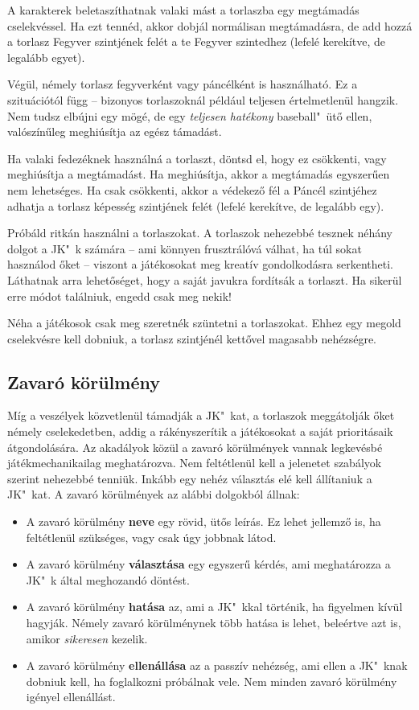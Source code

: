 A karakterek beletaszíthatnak valaki mást a torlaszba egy megtámadás cselekvéssel. Ha ezt tennéd, akkor dobjál normálisan megtámadásra, de add hozzá a torlasz Fegyver szintjének felét a te Fegyver szintedhez (lefelé kerekítve, de legalább egyet).

Végül, némely torlasz fegyverként vagy páncélként is használható. Ez a szituációtól függ -- bizonyos torlaszoknál például teljesen értelmetlenül hangzik. Nem tudsz elbújni egy  mögé, de egy  \emph{teljesen hatékony} baseball"~ütő ellen, valószínűleg meghiúsítja az egész támadást.

Ha valaki fedezéknek használná a torlaszt, döntsd el, hogy ez csökkenti, vagy meghiúsítja a megtámadást. Ha meghiúsítja, akkor a megtámadás egyszerűen nem lehetséges. Ha csak csökkenti, akkor a védekező fél a Páncél szintjéhez adhatja a torlasz képesség szintjének felét (lefelé kerekítve, de legalább egy).

Próbáld ritkán használni a torlaszokat. A torlaszok nehezebbé tesznek néhány dolgot a JK"~k számára -- ami könnyen frusztrálóvá válhat, ha túl sokat használod őket -- viszont a játékosokat meg kreatív gondolkodásra serkentheti. Láthatnak arra lehetőséget, hogy a saját javukra fordítsák a torlaszt. Ha sikerül erre módot találniuk, engedd csak meg nekik!

Néha a játékosok csak meg szeretnék szüntetni a torlaszokat. Ehhez egy megold cselekvésre kell dobniuk, a torlasz szintjénél kettővel magasabb nehézségre.

\newpage

\subsection{Zavaró körülmény}

Míg a veszélyek közvetlenül támadják a JK"~kat, a torlaszok meggátolják őket némely cselekedetben, addig a  rákényszerítik a játékosokat a saját prioritásaik átgondolására. Az akadályok közül a zavaró körülmények vannak legkevésbé játékmechanikailag meghatározva. Nem feltétlenül kell a jelenetet szabályok szerint nehezebbé tenniük. Inkább egy nehéz választás elé kell állítaniuk a JK"~kat. A zavaró körülmények az alábbi dolgokból állnak:

\begin{itemize}
    \item A zavaró körülmény \textbf{neve} egy rövid, ütős leírás. Ez lehet jellemző is, ha feltétlenül szükséges, vagy csak úgy jobbnak látod.
    \item A zavaró körülmény \textbf{választása} egy egyszerű kérdés, ami meghatározza a JK"~k által meghozandó döntést.
    \item A zavaró körülmény \textbf{hatása} az, ami a JK"~kkal történik, ha figyelmen kívül hagyják. Némely zavaró körülménynek több hatása is lehet, beleértve azt is, amikor \emph{sikeresen} kezelik.
    \item A zavaró körülmény \textbf{ellenállása} az a passzív nehézség, ami ellen a JK"~knak dobniuk kell, ha foglalkozni próbálnak vele. Nem minden zavaró körülmény igényel ellenállást.
\end{itemize}

